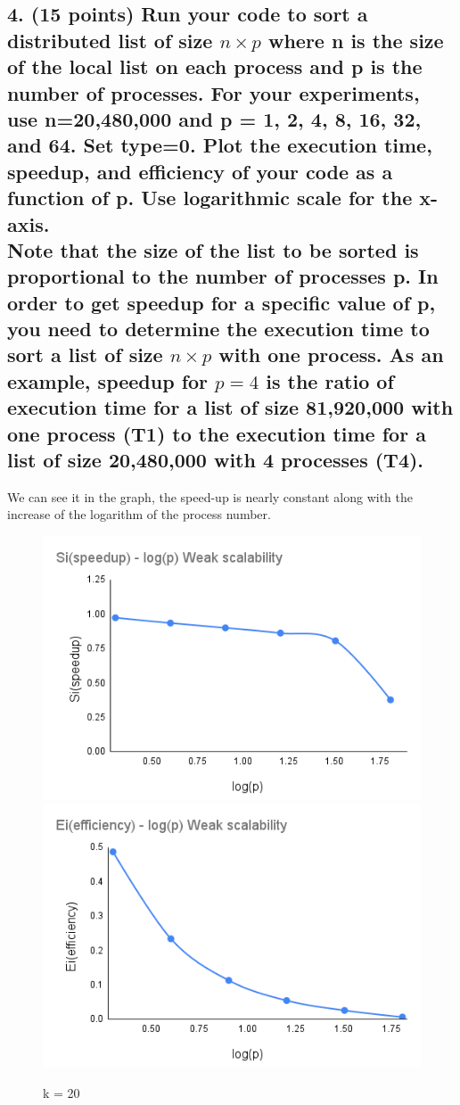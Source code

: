 \documentclass[pstricks,border=14pt,14pt]{article}
\begin{document}
\subsection*{4. (15 points) Run your code to sort a distributed list of size $n \times p$ where n is the size of the local list on each process and p is the number of processes. For your experiments, use n=20,480,000 and p = 1, 2, 4, 8, 16, 32, and 64. Set type=0. Plot the execution time, speedup, and efficiency of your code as a function of p. Use logarithmic scale for the x-axis. \\ Note that the size of the list to be sorted is proportional to the number of processes p. In order to get speedup for a specific value of p, you need to determine the execution time to sort a list of size $n \times p$ with one process. As an example, speedup for $p = 4$ is the ratio of execution time for a list of size 81,920,000 with one process (T1) to the execution time for a list of size 20,480,000 with 4 processes (T4).}
We can see it in the graph, the speed-up is nearly constant along with the increase of the logarithm of the process number. 
\begin{figure}[H]
    \centering
    \includegraphics[width=12cm]{Weak_scalability_Si_logP.png}
    \includegraphics[width=12cm]{Weak_scalability_Ei_logP.png}
    \caption{k = 20}
    \label{fig:my_label}
\end{figure}
\end{document}
